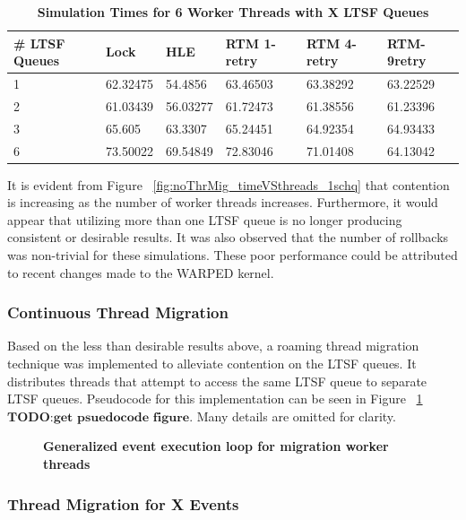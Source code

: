 \documentclass[a4paper]{article}
\begin{document}
\begin{table}[H]
    \centering
    \begin{tabular}{l|p{2cm}|p{2cm}|p{2cm}|p{2cm}|p{2cm}}
        \textbf{\# LTSF Queues}&Lock &HLE &RTM 1-retry &RTM 4-retry &RTM-9retry \\
        \hline
        \midrule
            1 &62.32475 &54.4856  &63.46503 &63.38292 &63.22529 \\  
            2 &61.03439 &56.03277 &61.72473 &61.38556 &61.23396 \\  
            3 &65.605   &63.3307  &65.24451 &64.92354 &64.93433 \\  
            6 &73.50022 &69.54849 &72.83046 &71.01408 &64.13042   
    \end{tabular}
    \caption{\textbf{Simulation Times for 6 Worker Threads with X LTSF Queues}}
    \label{tab:noThrMig_6threadsXschq}
\end{table}

\indent
It is evident from Figure ~\ref{fig:noThrMig_timeVSthreads_1schq} that
contention is increasing as the number of worker threads increases.
Furthermore, it would appear that utilizing more than one LTSF queue is no
longer producing consistent or desirable results. It was also observed that the
number of rollbacks was non-trivial for these simulations.  These poor
performance could be attributed to recent changes made to the WARPED kernel.\par

\subsubsection{\textbf{Continuous Thread Migration}}

\indent
Based on the less than desirable results above, a roaming thread migration
technique was implemented to alleviate contention on the LTSF queues.  It
distributes threads that attempt to access the same LTSF queue to separate LTSF
queues.  Pseudocode for this implementation can be seen in Figure
~\ref{fig:thread_migration} \(\textbf{TODO:get psuedocode figure}\).  Many
details are omitted for clarity.\par

\begin{figure}[H]
    \centering
    \graphicspath{ {./data/} }
    \caption{\textbf{Generalized event execution loop for migration worker
    threads}}
    \label{fig:thread_migration}
\end{figure}

\subsubsection{\textbf{Thread Migration for X Events}}
\end{document}
